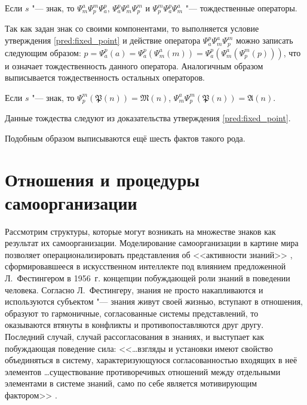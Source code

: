 \begin{Pred}
	Если $s$ "--- знак, то  $\Psi_m^a\Psi_p^m\Psi_a^p$, $\Psi_a^p\Psi_m^a\Psi_p^m$ и $\Psi_p^m\Psi_a^p\Psi_m^a$ "--- тождественные операторы.
\end{Pred}	
\begin{Proof}
	Так как задан знак со своими компонентами, то выполняется условие утверждения \ref{pred:fixed_point} и действие оператора $\Psi_a^p\Psi_m^a\Psi_p^m$ можно записать следующим образом:  $p=\Psi_a^p(a)=\Psi_a^p(\Psi_m^a(m))=\Psi_a^p(\Psi_m^a(\Psi_p^m(p)))$, что и означает тождественность данного оператора. Аналогичным образом выписывается тождественность остальных операторов.
\end{Proof}

\begin{Pred}
	Если $s$ "--- знак, то $\Psi_p^m(\mathfrak P(n))=\mathfrak M(n)$, $\Psi_m^a\Psi_p^m(\mathfrak P(n))=\mathfrak A(n)$.
\end{Pred}	
\begin{Proof}
	Данные тождества следуют из доказательства утверждения \ref{pred:fixed_point}.
\end{Proof}

Подобным образом выписываются ещё шесть фактов такого рода.


\section{Отношения и процедуры самоорганизации} \label{sect2_3}

Рассмотрим структуры, которые могут возникать на множестве знаков как результат их самоорганизации. Моделирование самоорганизации в картине мира позволяет операционализировать представления об <<активности знаний>> \cite{Osipov2002b}, сформировавшееся в искусственном интеллекте под влиянием предложенной Л.~Фестингером в 1956~г. концепции побуждающей роли знаний в поведении человека. Согласно Л.~Фестингеру, знания не просто накапливаются и используются субъектом "--- знания живут своей жизнью, вступают в отношения, образуют то гармоничные, согласованные системы представлений, то оказываются втянуты в конфликты и противопоставляются друг другу. Последний случай, случай рассогласования в знаниях, и выступает как побуждающая поведение сила: <<\dots взгляды и установки имеют свойство объединяться в систему, характеризующуюся согласованностью входящих в неё элементов \dots существование противоречивых отношений между отдельными элементами в системе знаний, само по себе является мотивирующим фактором>> \cite{Festinger1999}.

